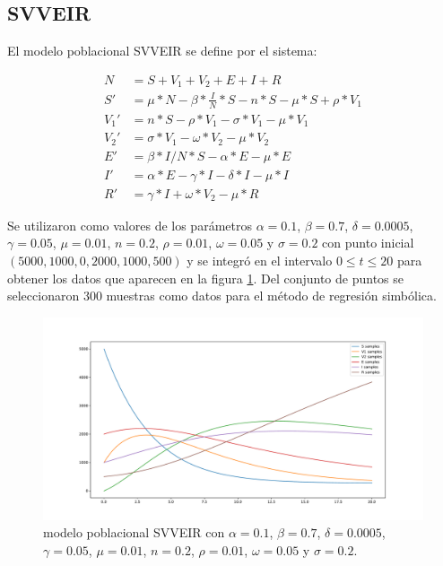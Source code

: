 \subsection{SVVEIR}

El modelo poblacional SVVEIR se define por el sistema:

\begin{align*}
    N    & = S + V_1 + V_2 + E + I + R                                        \\
    S'   & = \mu * N - \beta * \frac{I}{N} * S - n * S - \mu * S + \rho * V_1 \\
    V_1' & = n * S - \rho * V_1 - \sigma * V_1 - \mu * V_1                    \\
    V_2' & = \sigma * V_1 - \omega * V_2 - \mu * V_2                          \\
    E'   & = \beta * I / N * S - \alpha * E - \mu * E                         \\
    I'   & = \alpha * E - \gamma * I - \delta * I - \mu * I                   \\
    R'   & = \gamma * I + \omega * V_2 - \mu * R
\end{align*}

Se utilizaron como valores de los parámetros $\alpha = 0.1$, $\beta = 0.7$, $\delta = 0.0005$, $\gamma = 0.05$, $\mu = 0.01$, $n = 0.2$, $\rho = 0.01$, $\omega = 0.05$ y $\sigma = 0.2$ con punto inicial $(5000, 1000, 0, 2000, 1000, 500)$ y se integró en el intervalo $0 \leq t \leq 20$ para obtener los datos que aparecen en la figura \ref{fig:SVVEIR}. Del conjunto de puntos se seleccionaron 300 muestras como datos para el método de regresión simbólica.

\begin{figure}[h]
    \centering
    \includegraphics[width=\textwidth]{"figures/SVVEIR.pdf"}
    \caption{modelo poblacional SVVEIR con $\alpha = 0.1$, $\beta = 0.7$, $\delta = 0.0005$, $\gamma = 0.05$, $\mu = 0.01$, $n = 0.2$, $\rho = 0.01$, $\omega = 0.05$ y $\sigma = 0.2$.}
    \label{fig:SVVEIR}
\end{figure}

